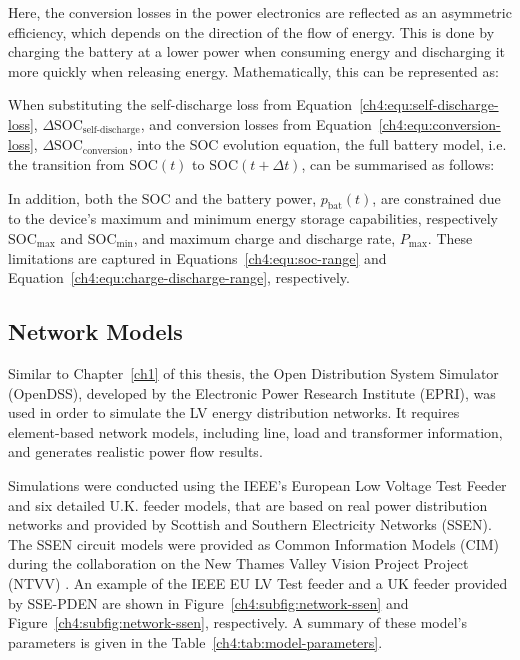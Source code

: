 

Here, the conversion losses in the power electronics are reflected as an asymmetric efficiency, which depends on the direction of the flow of energy.
This is done by charging the battery at a lower power when consuming energy and discharging it more quickly when releasing energy.
Mathematically, this can be represented as:



When substituting the self-discharge loss from Equation~\ref{ch4:equ:self-discharge-loss}, $\Delta\text{SOC}_\text{self-discharge}$, and conversion losses from Equation~\ref{ch4:equ:conversion-loss}, $\Delta\text{SOC}_\text{conversion}$, into the SOC evolution equation, the full battery model, i.e. the transition from $\text{SOC}(t)$ to $\text{SOC}(t+\Delta t)$, can be summarised as follows:



In addition, both the SOC and the battery power, $p_\text{bat}(t)$, are constrained due to the device's maximum and minimum energy storage capabilities, respectively $\text{SOC}_\text{max}$ and $\text{SOC}_\text{min}$, and maximum charge and discharge rate, $P_\text{max}$.
These limitations are captured in Equations~\ref{ch4:equ:soc-range} and Equation~\ref{ch4:equ:charge-discharge-range}, respectively.





\subsection{Network Models}
\label{ch4:subsec:network-models}

Similar to Chapter~\ref{ch1} of this thesis, the Open Distribution System Simulator (OpenDSS), developed by the Electronic Power Research Institute (EPRI), was used in order to simulate the LV energy distribution networks.
It requires element-based network models, including line, load and transformer information, and generates realistic power flow results.



Simulations were conducted using the IEEE's European Low Voltage Test Feeder \cite{EULVFeeder2015} and six detailed U.K. feeder models, that are based on real power distribution networks and provided by Scottish and Southern Electricity Networks (SSEN).
The SSEN circuit models were provided as Common Information Models (CIM) during the collaboration on the New Thames Valley Vision Project Project (NTVV) \cite{NTVV2016}.
An example of the IEEE EU LV Test feeder and a UK feeder provided by SSE-PDEN are shown in Figure~\ref{ch4:subfig:network-ssen} and Figure~\ref{ch4:subfig:network-ssen}, respectively.
A summary of these model's parameters is given in the Table~\ref{ch4:tab:model-parameters}.

